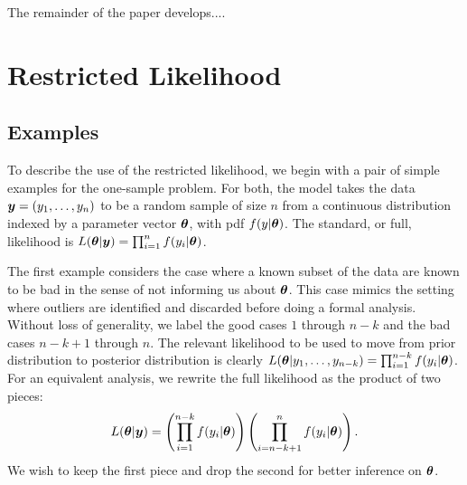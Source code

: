 \documentclass[12pt]{article}
\def\bth{\mbox{\boldmath $\theta$}}
\newcommand{\by}{\mbox{\boldmath $y$}}
\begin{document}
The remainder of the paper develops....  %

\section{Restricted Likelihood}
\label{restrictedlikelihood}

\subsection{Examples}
To describe the use of the restricted likelihood, 
we begin with a pair of simple examples for the one-sample problem.  For both, the model takes the data $\by=(y_1,\ldots,y_n)$ to be a random sample
of size $n$ from a continuous distribution indexed by a parameter
vector $\bth$, with pdf $f(y| \bth)$.  The standard, or full,
likelihood is $L(\bth | \by) = \prod_{i=1}^n f(y_i | \bth)$.  

The first example considers the case where a known subset of the data are known to be 
bad in the sense of not informing us about $\bth$.  This case mimics the setting where outliers are identified and discarded before doing a formal analysis.  Without loss of generality, we label the good cases $1$ through $n-k$ and the bad cases $n-k+1$ through $n$.  The relevant likelihood to be used to move from prior distribution to posterior distribution is clearly $L(\bth | y_1, \ldots, y_{n-k}) = \prod_{i=1}^{n-k} f(y_i | \bth)$.  For an equivalent analysis, we rewrite the full likelihood as the product of two pieces:
\begin{eqnarray}
\label{OutlyingCases}
L(\bth | \by)  
= \left( \prod_{i=1}^{n-k} f(y_i | \bth) \right) \left( \prod_{i=n-k+1}^{n} f(y_i | \bth) \right) .  
\end{eqnarray}
We wish to keep the first piece and drop the second for better inference on $\bth$.
\end{document}
